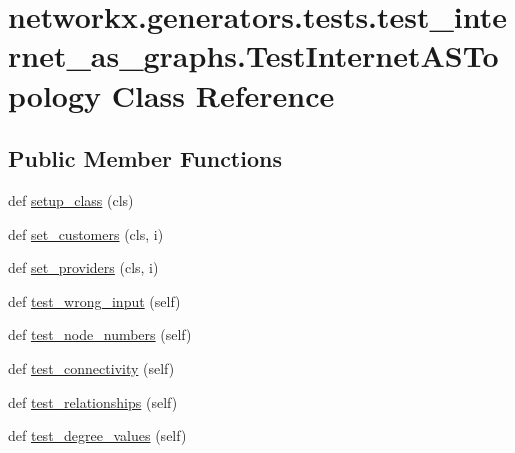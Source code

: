 \hypertarget{classnetworkx_1_1generators_1_1tests_1_1test__internet__as__graphs_1_1TestInternetASTopology}{}\section{networkx.\+generators.\+tests.\+test\+\_\+internet\+\_\+as\+\_\+graphs.\+Test\+Internet\+A\+S\+Topology Class Reference}
\label{classnetworkx_1_1generators_1_1tests_1_1test__internet__as__graphs_1_1TestInternetASTopology}
\subsection*{Public Member Functions}
\begin{DoxyCompactItemize}
\item 
def \hyperlink{classnetworkx_1_1generators_1_1tests_1_1test__internet__as__graphs_1_1TestInternetASTopology_a2069207d4e95322ff470a55283a6cf98}{setup\+\_\+class} (cls)
\item 
def \hyperlink{classnetworkx_1_1generators_1_1tests_1_1test__internet__as__graphs_1_1TestInternetASTopology_a7316128fb676fe7e1a760ca1b4d4de2d}{set\+\_\+customers} (cls, i)
\item 
def \hyperlink{classnetworkx_1_1generators_1_1tests_1_1test__internet__as__graphs_1_1TestInternetASTopology_af79fbea0558566ac8590872118afb495}{set\+\_\+providers} (cls, i)
\item 
def \hyperlink{classnetworkx_1_1generators_1_1tests_1_1test__internet__as__graphs_1_1TestInternetASTopology_acb995c8bc577ebf802e649c54172ef36}{test\+\_\+wrong\+\_\+input} (self)
\item 
def \hyperlink{classnetworkx_1_1generators_1_1tests_1_1test__internet__as__graphs_1_1TestInternetASTopology_a7d4669b9651ec9ac941700d850f32d7c}{test\+\_\+node\+\_\+numbers} (self)
\item 
def \hyperlink{classnetworkx_1_1generators_1_1tests_1_1test__internet__as__graphs_1_1TestInternetASTopology_ae1ad151ecb8cbd55052aca111201379f}{test\+\_\+connectivity} (self)
\item 
def \hyperlink{classnetworkx_1_1generators_1_1tests_1_1test__internet__as__graphs_1_1TestInternetASTopology_aaf8d4af16470ca9de8cb7e2fbff48e10}{test\+\_\+relationships} (self)
\item 
def \hyperlink{classnetworkx_1_1generators_1_1tests_1_1test__internet__as__graphs_1_1TestInternetASTopology_aff5ef8c380794719d846cbf9a0f1fe02}{test\+\_\+degree\+\_\+values} (self)
\end{DoxyCompactItemize}
